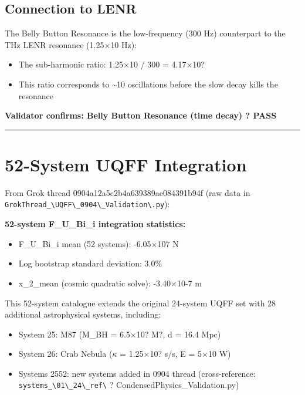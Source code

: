 \documentclass[12pt,a4paper]{article}
\begin{document}
\subsection{Connection to LENR}

The Belly Button Resonance is the low-frequency (300 Hz) counterpart to the THz LENR resonance (1.25$\times$10 Hz):

\begin{itemize}
  \item The sub-harmonic ratio: 1.25$\times$10 / 300 = 4.17$\times$10?
  \item This ratio corresponds to \textasciitilde{}10 oscillations before the slow decay kills the resonance
\end{itemize}

\textbf{Validator confirms: Belly Button Resonance (time decay) ? PASS}

\medskip\hrule\medskip

\section{52-System UQFF Integration}

From Grok thread 0904a12a5c2b4a639389ae084391b94f (raw data in \texttt{GrokThread\_\textbackslash {UQFF\textbackslash \_0904\textbackslash \_Validation\textbackslash }.py}):

\textbf{52-system F\_{U\_Bi\_i} integration statistics:}

\begin{itemize}
  \item F\_{U\_Bi\_i} mean (52 systems): -6.05$\times$107 N
  \item Log bootstrap standard deviation: 3.0\%
  \item x\_{2\_mean} (cosmic quadratic solve): -3.40$\times$10-7 m
\end{itemize}

This 52-system catalogue extends the original 24-system UQFF set with 28 additional astrophysical systems, including:

\begin{itemize}
  \item System 25: M87 (M\_BH = 6.5$\times$10? M?, d = 16.4 Mpc)
  \item System 26: Crab Nebula ($\kappa$ = 1.25$\times$10? s/s, E = 5$\times$10 W)
  \item Systems 2552: new systems added in 0904 thread (cross-reference: \texttt{systems\_\textbackslash {01\textbackslash \_24\textbackslash \_ref\textbackslash }} ? CondensedPhysics\_Validation.py)
\end{itemize}
\end{document}
